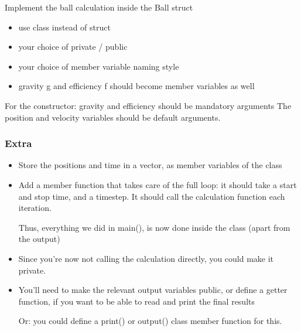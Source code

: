 \documentclass[a4paper]{article}
\begin{document}
Implement the ball calculation inside the Ball struct

\begin{itemize}

\item use class instead of struct 
\item your choice of private / public 
\item your choice of member variable naming style
\item gravity g and efficiency f should become member variables as well

\end{itemize}

For the constructor: gravity and efficiency should be mandatory arguments The position and velocity variables should be default arguments.

\subsubsection*{Extra}

\begin{itemize}

\item Store the positions and time in a vector, as member variables of the class

\item Add a member function that takes care of the full loop: it should take a start and stop time, and a timestep. It should call the calculation function each iteration. 

  Thus, everything we did in main(), is now done inside the class (apart from the output)

\item Since you’re now not calling the calculation directly, you could make it private.

\item You’ll need to make the relevant output variables public, or define a getter function, if you want to be able to read and print the final results 

  Or: you could define a print() or output() class member function for this.
  
\end{itemize}
\end{document}
